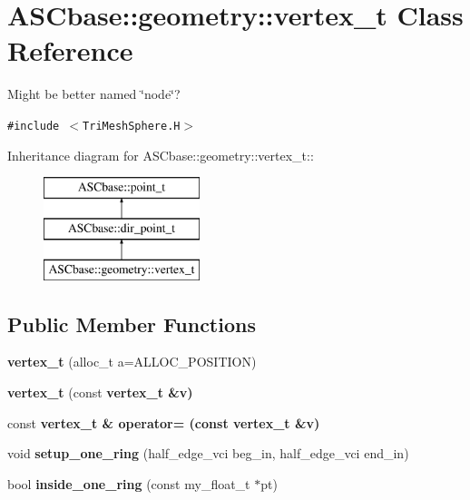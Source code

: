 \section{ASCbase::geometry::vertex\_\-t Class Reference}
\label{classASCbase_1_1geometry_1_1vertex__t}
Might be better named \char`\"{}node\char`\"{}?  


{\tt \#include $<$Tri\-Mesh\-Sphere.H$>$}

Inheritance diagram for ASCbase::geometry::vertex\_\-t::\begin{figure}[H]
\begin{center}
\leavevmode
\includegraphics[height=3cm]{classASCbase_1_1geometry_1_1vertex__t}
\end{center}
\end{figure}
\subsection*{Public Member Functions}
\begin{CompactItemize}
\item 
\textbf{vertex\_\-t} (alloc\_\-t a=ALLOC\_\-POSITION)\label{classASCbase_1_1geometry_1_1vertex__t_b26d405918f18263845710e1cbdbd478}

\item 
\textbf{vertex\_\-t} (const \bf{vertex\_\-t} \&v)\label{classASCbase_1_1geometry_1_1vertex__t_369761b4291cb2a821f12dd56e409eb7}

\item 
const \bf{vertex\_\-t} \& \textbf{operator=} (const \bf{vertex\_\-t} \&v)\label{classASCbase_1_1geometry_1_1vertex__t_9073d65a8993b63729b0ddea759c7cd6}

\item 
void \textbf{setup\_\-one\_\-ring} (half\_\-edge\_\-vci beg\_\-in, half\_\-edge\_\-vci end\_\-in)\label{classASCbase_1_1geometry_1_1vertex__t_10f4bc8c2b1f885ebe29a995acdb3d31}

\item 
bool \textbf{inside\_\-one\_\-ring} (const my\_\-float\_\-t $\ast$pt)\label{classASCbase_1_1geometry_1_1vertex__t_107f530235423b366efbcd69c33d8f21}

\end{CompactItemize}
